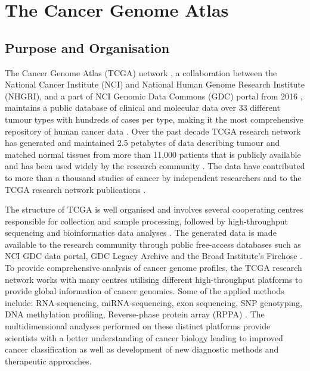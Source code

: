     \newpage    
    \section{The Cancer Genome Atlas}
    
    
    
    \subsection{Purpose and Organisation}

    The Cancer Genome Atlas (TCGA) network \cite{TheTCGA}, a collaboration between the National Cancer Institute (NCI) and National Human Genome Research Institute (NHGRI), and a part of NCI Genomic Data Commons (GDC) portal from 2016 \cite{NCICommons, gdc2016}, maintains a public database of clinical and molecular data over 33 different tumour types with hundreds of cases per type, making it the most comprehensive repository of human cancer data \cite{OverviewTCGA}. Over the past decade TCGA research network has generated and maintained 2.5 petabytes of data describing tumour and matched normal tissues from more than 11,000 patients that is publicly available and has been used widely by the research community \cite{OverviewTCGA}. The data have contributed to more than a thousand studies of cancer by independent researchers and to the TCGA research network publications \cite{Editorial.2015TheGenomics}.

    The structure of TCGA is well organised and involves several cooperating centres responsible for collection and sample processing, followed by high-throughput sequencing and bioinformatics data analyses \cite{OverviewTCGA, Tomczak2015TheKnowledge}. The generated data is made available to the research community through public free-access databases such as NCI GDC data portal, GDC Legacy Archive and the Broad Institute’s Firehose \cite{Silva2016TCGAPackages}. \\To provide comprehensive analysis of cancer genome profiles, the TCGA research network works with many centres utilising different high-throughput platforms to provide global information of cancer genomics. Some of the applied methods include: RNA-sequencing, miRNA-sequencing, exon sequencing, SNP genotyping, DNA methylation profiling, Reverse-phase protein array (RPPA) \cite{OverviewTCGA}. The multidimensional analyses performed on these distinct platforms provide scientists with a better understanding of cancer biology leading to improved cancer classification as well as development of new diagnostic methods and therapeutic approaches.\\



